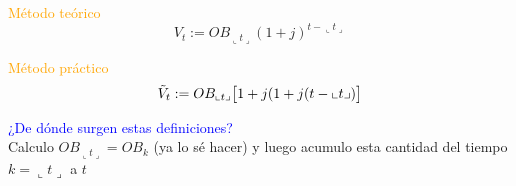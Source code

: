 \begin{center}
\begin{tikzpicture}[x=0.75pt,y=0.75pt,yscale=-1,xscale=1]
\end{tikzpicture}

\end{center}

\begin{multicols}{2}
    \centering
    \textcolor{orange}{Método teórico}
    $$V_t := OB_{\llcorner t\lrcorner}(1+j)^{t-\llcorner t\lrcorner}$$
   
    \columnbreak
    
    \textcolor{orange}{Método práctico}
    $$\Tilde{V}_t := OB_{\llcorner t\lrcorner}\big[1+j(1+j(t-\llcorner t\lrcorner)\big]$$
\end{multicols}

\textcolor{blue}{¿De dónde surgen estas definiciones?}\\
Calculo $OB_{\llcorner t\lrcorner} = OB_k$ (ya lo sé hacer) y luego acumulo esta cantidad del tiempo $k=\llcorner t\lrcorner$ a $t$
